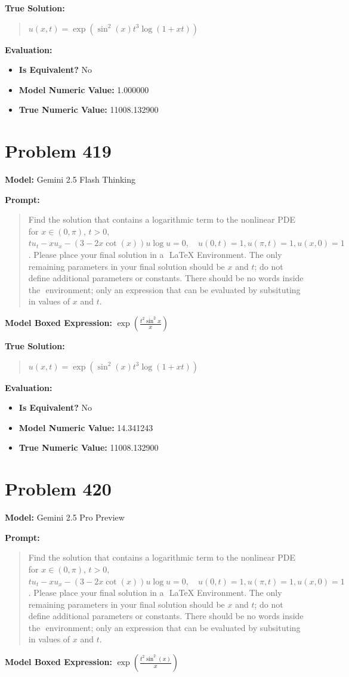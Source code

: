 \documentclass{article}
\begin{document}
\textbf{True Solution:}
\begin{quote}
$u(x,t) = \exp(\sin^2(x) t^3 \log(1 + xt))$
\end{quote}

\textbf{Evaluation:}
\begin{itemize}
\item \textbf{Is Equivalent?} No
\item \textbf{Model Numeric Value:} 1.000000
\item \textbf{True Numeric Value:} 11008.132900
\end{itemize}
\vspace{1cm}
\section*{Problem 419}
\textbf{Model:} Gemini 2.5 Flash Thinking

\textbf{Prompt:}
\begin{quote}
Find the solution that contains a logarithmic term to the nonlinear PDE for $x \in (0, \pi)$, $t > 0$, $ t u_t - x u_x - (3 - 2x \cot(x) ) u \log u = 0, \quad u(0, t) = 1, u(\pi, t) = 1, u(x, 0) = 1 $. Please place your final solution in a $\boxed{}$ LaTeX Environment. The only remaining parameters in your final solution should be $x$ and $t$; do not define additional parameters or constants. There should be no words inside the $\boxed{}$ environment; only an expression that can be evaluated by subsituting in values of $x$ and $t$.
\end{quote}
\textbf{Model Boxed Expression:} $\exp\left(\frac{t^2 \sin^2 x}{x}\right)$

\textbf{True Solution:}
\begin{quote}
$u(x,t) = \exp(\sin^2(x) t^3 \log(1 + xt))$
\end{quote}

\textbf{Evaluation:}
\begin{itemize}
\item \textbf{Is Equivalent?} No
\item \textbf{Model Numeric Value:} 14.341243
\item \textbf{True Numeric Value:} 11008.132900
\end{itemize}
\vspace{1cm}
\section*{Problem 420}
\textbf{Model:} Gemini 2.5 Pro Preview

\textbf{Prompt:}
\begin{quote}
Find the solution that contains a logarithmic term to the nonlinear PDE for $x \in (0, \pi)$, $t > 0$, $ t u_t - x u_x - (3 - 2x \cot(x) ) u \log u = 0, \quad u(0, t) = 1, u(\pi, t) = 1, u(x, 0) = 1 $. Please place your final solution in a $\boxed{}$ LaTeX Environment. The only remaining parameters in your final solution should be $x$ and $t$; do not define additional parameters or constants. There should be no words inside the $\boxed{}$ environment; only an expression that can be evaluated by subsituting in values of $x$ and $t$.
\end{quote}
\textbf{Model Boxed Expression:} $\exp\left(\frac{t^2\sin^2(x)}{x}\right)$
\end{document}
